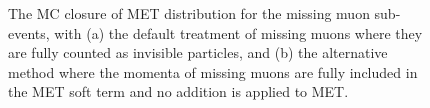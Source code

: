 \begin{description}
\begin{figure}[h]
  \centering
    \caption{The MC closure of MET distribution for the missing muon sub-events, with (a) the default treatment of missing muons where they are fully counted as invisible particles, and (b) the alternative method where the momenta of missing muons are fully included in the MET soft term and no addition is applied to MET.
      \label{fig::BGestimation::objRep::mcClosure::metSoftTerm_mu} }
\end{figure}



\end{description}
